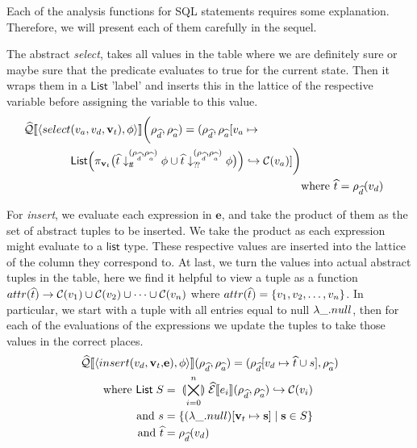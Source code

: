 Each of the analysis functions for SQL statements requires some explanation.
Therefore, we will present each of them carefully in the sequel.

The abstract \textit{select}, takes all values in the table where we are definitely sure or maybe sure that the predicate evaluates to true for the current state.
Then it wraps them in a $\mathsf{List}$ 'label' and inserts this in the lattice of the respective variable before assigning the variable to this value.
\begin{align}
\begin{split} \nonumber
    \widehat{\mathcal{Q}}\llbracket \langle select&(v_a, v_d, \mathbf{v}_t), \phi \rangle \rrbracket\biggl(\rho_{\widehat{d}}, \rho_{\widehat{a}})
    = (\rho_{\widehat{d}}, \rho_{\widehat{a}}[v_a \mapsto \\
    &\mathsf{List} \Bigl( \pi_{\mathbf{v}_t} \bigl(\widehat{t} \downarrow_{t\!t}^{(\rho_{\widehat{d}}, \rho_{\widehat{a}})} \phi \cup \widehat{t} \downarrow_{?\!?}^{(\rho_{\widehat{d}}, \rho_{\widehat{a}})} \phi \bigr) \Bigr) \hookrightarrow \mathcal{C}(v_a) ]\biggr)
\end{split}\\
    &\text{where } \widehat{t}=\rho_{\widehat{d}}(v_d)
\end{align}

For \textit{insert}, we evaluate each expression in $\mathbf{e}$, and take the product of them as the set of abstract tuples to be inserted.
We take the product as each expression might evaluate to a $\mathsf{list}$ type.
These respective values are inserted into the lattice of the column they correspond to.
At last, we turn the values into actual abstract tuples in the table, here we find it helpful to view a tuple as a function $attr(\widehat{t}) \rightarrow \mathcal{C}(v_1) \cup \mathcal{C}(v_2) \cup \dots \cup \mathcal{C}(v_n)$ where $attr(\widehat{t}) = \{v_1, v_2, \dots, v_n\}$.
In particular, we start with a tuple with all entries equal to null $\lambda\_.null$, then for each of the evaluations of the expressions we update the tuples to take those values in the correct places.
\begin{align}
    \widehat{\mathcal{Q}}\llbracket \langle insert(v_d, \mathbf{v}_t, &\mathbf{e}), \phi \rangle \rrbracket(\rho_{\widehat{d}}, \rho_{\widehat{a}}) = (\rho_{\widehat{d}}[v_d\mapsto \widehat{t}\cup s], \rho_{\widehat{a}}) \nonumber \\
    \text{where } \mathsf{List} \; S &= \;\llparenthesis\bigtimes_{i = 0}^{n}\rrparenthesis\; \widehat{\mathcal{E}}\llbracket e_i \rrbracket(\rho_{\widehat{d}}, \rho_{\widehat{a}}) \hookrightarrow \mathcal{C}(v_i) \nonumber\\
    \text{and } s &= \left\{ (\lambda\_.null)[\mathbf{v}_t \mapsto \mathbf{s}] \;\middle|\; \mathbf{s} \in S\right\} \nonumber\\
    \text{and } \widehat{t}&=\rho_{\widehat{d}}(v_d)
\end{align}

